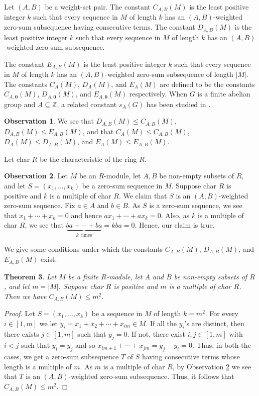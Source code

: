 \documentclass{article}[11pt]
\newtheorem{theorem}{Theorem}[section]
\theoremstyle{definition}
\newtheorem{observation}[theorem]{Observation}
\begin{document}
Let $(A,B)$ be a weight-set pair. The constant $C_{A,B}(M)$ is the least positive integer $k$ such that every sequence in $M$ of length $k$ has an $(A,B)$-weighted zero-sum subsequence having consecutive terms. The constant $D_{A,B}(M)$ is the least positive integer $k$ such that every sequence in $M$ of length $k$ has an $(A,B)$-weighted zero-sum subsequence.

The constant $E_{A,B}(M)$ is the least positive integer $k$ such that every sequence in $M$ of length $k$ has an $(A,B)$-weighted zero-sum subsequence of length $|M|$. The constants $C_A(M)$, $D_A(M)$, and $E_A(M)$ are defined to be the constants $C_{A,\mathbf 0}(M)$, $D_{A,\mathbf 0}(M)$, and $E_{A,\mathbf 0}(M)$ respectively. When $G$ is a finite abelian group and $A\subseteq \mathbb Z$, a related constant $s_A(G)$ has been studied in \cite{AGS}.

\begin{observation}\label{cca}
We see that $D_{A,B}(M)\leq C_{A,B}(M)$, $D_{A,B}(M)\leq E_{A,B}(M)$, and that $C_A(M)\leq C_{A,B}(M)$, $D_A(M)\leq D_{A,B}(M)$, and $E_A(M)\leq E_{A,B}(M)$.
\end{observation}

Let char $R$ be the characteristic of the ring $R$.

\begin{observation}\label{char}
Let $M$ be an $R$-module, let $A,B$ be non-empty subsets of $R$, and let $S=(x_1,\ldots,x_k)$ be a zero-sum sequence in $M$. Suppose char $R$ is positive and $k$ is a multiple of char $R$. We claim that $S$ is an $(A,B)$-weighted zero-sum sequence. Fix $a\in A$ and $b\in B$. As $S$ is a zero-sum sequence, we see that $x_1+\cdots+x_k=0$ and hence $ax_1+\cdots+ax_k=0$. Also, as $k$ is a multiple of char $R$, we see that $\underbrace{ba+\cdots+ba}_\text{$k$ times}=kba=0$. Hence, our claim is true.
\end{observation}


We give some conditions under which the constants $C_{A,B}(M)$, $D_{A,B}(M)$, and $E_{A,B}(M)$ exist.


\begin{theorem}\label{upbd}
Let $M$ be a finite $R$-module, let $A$ and $B$ be non-empty subsets of $R$, and let $m=|M|$. Suppose char $R$ is positive and $m$ is a multiple of char $R$. Then we have $C_{A,B}(M)\leq m^2$.
\end{theorem}

\begin{proof}
Let $S=(x_1,\ldots,x_k)$ be a sequence in $M$ of length $k=m^2$. For every $i\in [1,m]$ we let $y_i=x_1+x_2+\cdots+x_{im}\in M$. If all the $y_i$'s are distinct, then there exists $j\in [1,m]$ such that $y_j=0$. If not, there exist $i,j\in [1,m]$ with $i<j$ such that $y_i=y_j$ and so $x_{im+1}+\cdots +x_{jm}=y_j-y_i=0$. Thus, in both the cases, we get a zero-sum subsequence $T$ of $S$ having consecutive terms whose length is a multiple of $m$. As $m$ is a multiple of char $R$, by Observation \ref{char} we see that $T$ is an $(A,B)$-weighted zero-sum subsequence. Thus, it follows that $C_{A,B}(M)\leq m^2$.
\end{proof}
\end{document}
